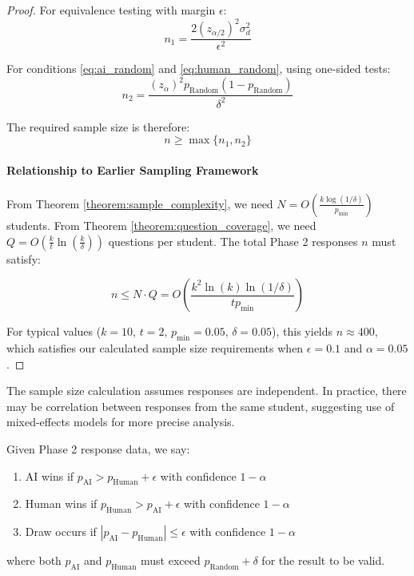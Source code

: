 \begin{proof}
For equivalence testing with margin $\epsilon$:
\begin{equation}
n_1 = \frac{2(z_{\alpha/2})^2\sigma^2_d}{\epsilon^2}
\end{equation}

For conditions \eqref{eq:ai_random} and \eqref{eq:human_random}, using one-sided tests:
\begin{equation}
n_2 = \frac{(z_\alpha)^2p_{\mathrm{Random}}(1-p_{\mathrm{Random}})}{\delta^2}
\end{equation}

The required sample size is therefore:
\begin{equation}
n \geq \max\{n_1, n_2\}
\end{equation}

\paragraph{Relationship to Earlier Sampling Framework}
From Theorem \ref{theorem:sample_complexity}, we need $N = O(\frac{k\log(1/\delta)}{p_{\mathrm{min}}})$ students. From Theorem \ref{theorem:question_coverage}, we need $Q = O(\frac{k}{t}\ln(\frac{k}{\delta}))$ questions per student. The total Phase 2 responses $n$ must satisfy:

\begin{equation}
n \leq N \cdot Q = O\left(\frac{k^2\ln(k)\ln(1/\delta)}{tp_{\mathrm{min}}}\right)
\end{equation}

For typical values ($k=10$, $t=2$, $p_{\mathrm{min}}=0.05$, $\delta=0.05$), this yields $n \approx 400$, which satisfies our calculated sample size requirements when $\epsilon = 0.1$ and $\alpha = 0.05$.
\end{proof}

\begin{remark}
The sample size calculation assumes responses are independent. In practice, there may be correlation between responses from the same student, suggesting use of mixed-effects models for more precise analysis.
\end{remark}

\begin{definition}
Given Phase 2 response data, we say:

\begin{enumerate}
\item AI wins if $p_{\mathrm{AI}} > p_{\mathrm{Human}} + \epsilon$ with confidence $1-\alpha$

\item Human wins if $p_{\mathrm{Human}} > p_{\mathrm{AI}} + \epsilon$ with confidence $1-\alpha$

\item Draw occurs if $|p_{\mathrm{AI}} - p_{\mathrm{Human}}| \leq \epsilon$ with confidence $1-\alpha$
\end{enumerate}

where both $p_{\mathrm{AI}}$ and $p_{\mathrm{Human}}$ must exceed $p_{\mathrm{Random}} + \delta$ for the result to be valid.
\end{definition}

